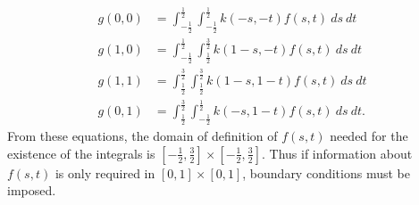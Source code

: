 \documentclass[12pt,notitlepage]{report}
\begin{document}
\begin{align*}
g(0,0) &= \int_{-\frac{1}{2}}^{\frac{1}{2}} \int_{-\frac{1}{2}}^{\frac{1}{2}} k(-s,-t)f(s,t)~ds~dt \\
g(1,0) &= \int_{-\frac{1}{2}}^{\frac{1}{2}} \int_{\frac{1}{2}}^{\frac{3}{2}} k(1-s,-t)f(s,t)~ds~dt \\
g(1,1) &= \int_{\frac{1}{2}}^{\frac{3}{2}} \int_{\frac{1}{2}}^{\frac{3}{2}} k(1-s,1-t)f(s,t)~ds~dt \\
g(0,1) &= \int_{\frac{1}{2}}^{\frac{3}{2}} \int_{-\frac{1}{2}}^{\frac{1}{2}} k(-s,1-t)f(s,t)~ds~dt.
\end{align*}
From these equations, the domain of definition of $f(s,t)$ needed for the existence of the integrals is $[-\frac{1}{2},\frac{3}{2}] \times [-\frac{1}{2},\frac{3}{2}]$. Thus if information about $f(s,t)$ is only required in $[0,1] \times [0,1]$, boundary conditions must be imposed.
\end{document}

